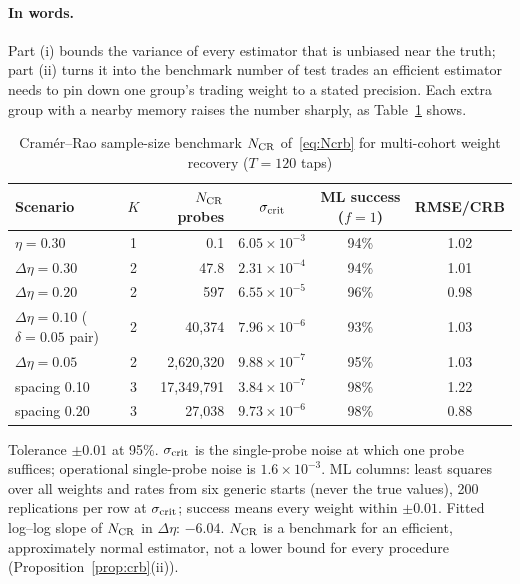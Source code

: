 \paragraph{In words.} Part (i) bounds the variance of every estimator that is unbiased near the truth; part (ii) turns it into the benchmark number of test trades an efficient estimator needs to pin down one group's trading weight to a stated precision. Each extra group with a nearby memory raises the number sharply, as Table~\ref{tab:crb} shows.

\begin{table}[t]\centering\small
\begin{threeparttable}
\caption{Cram\'er--Rao sample-size benchmark $N_{\rm CR}$ of~\eqref{eq:Ncrb} for multi-cohort weight recovery ($T=120$ taps)}\label{tab:crb}
\begin{tabular}{lcrccc}
\toprule
Scenario & $K$ & $N_{\rm CR}$ probes & $\sigma_{\rm crit}$ & ML success ($f=1$) & RMSE/CRB\\
\midrule
$\eta=0.30$ & 1 & 0.1 & $6.05\times10^{-3}$ & 94\% & 1.02\\
$\Delta\eta=0.30$ & 2 & 47.8 & $2.31\times10^{-4}$ & 94\% & 1.01\\
$\Delta\eta=0.20$ & 2 & 597 & $6.55\times10^{-5}$ & 96\% & 0.98\\
$\Delta\eta=0.10$ ($\delta=0.05$ pair) & 2 & 40{,}374 & $7.96\times10^{-6}$ & 93\% & 1.03\\
$\Delta\eta=0.05$ & 2 & 2{,}620{,}320 & $9.88\times10^{-7}$ & 95\% & 1.03\\
spacing 0.10 & 3 & 17{,}349{,}791 & $3.84\times10^{-7}$ & 98\% & 1.22\\
spacing 0.20 & 3 & 27{,}038 & $9.73\times10^{-6}$ & 98\% & 0.88\\
\bottomrule
\end{tabular}
\begin{tablenotes}\footnotesize\item Tolerance $\pm0.01$ at 95\%. $\sigma_{\rm crit}$ is the single-probe noise at which one probe suffices; operational single-probe noise is $1.6\times10^{-3}$. ML columns: least squares over all weights and rates from six generic starts (never the true values), 200 replications per row at $\sigma_{\rm crit}$; success means every weight within $\pm0.01$. Fitted log--log slope of $N_{\rm CR}$ in $\Delta\eta$: $-6.04$. $N_{\rm CR}$ is a benchmark for an efficient, approximately normal estimator, not a lower bound for every procedure (Proposition~\ref{prop:crb}(ii)). \end{tablenotes}
\end{threeparttable}
\end{table}

